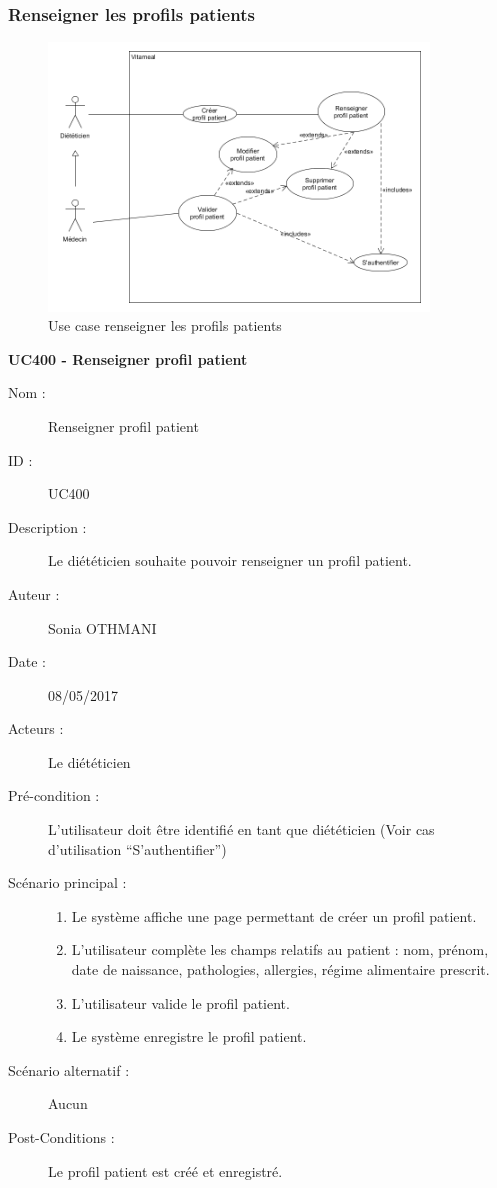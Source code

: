 \subsubsection{Renseigner les profils patients}

\begin{figure}[!h]
  \label{diagramme-renseigner-les-profils-patients}
  \centering
  \includegraphics[width=0.9\textwidth]{../../CasDUtilisations/ProfilPatient/ProfilPatient.png}
  \caption{Use case renseigner les profils patients}
\end{figure}

\textbf{UC400 - Renseigner profil patient}
\begin{description}
\item [Nom :] Renseigner profil patient
\item [ID :] UC400
\item [Description :] Le diététicien souhaite pouvoir renseigner un profil patient.
\item [Auteur :] Sonia OTHMANI
\item [Date :] 08/05/2017
\item [Acteurs :] Le diététicien
\item [Pré-condition :] L’utilisateur doit être identifié en tant que diététicien (Voir cas d’utilisation \enquote{S’authentifier})
\item [Scénario principal :]
  \begin{enumerate}
  \item Le système affiche une page permettant de créer un profil patient.
  \item L’utilisateur complète les champs relatifs au patient : nom, prénom, date de naissance, pathologies, allergies, régime alimentaire prescrit.
  \item L’utilisateur valide le profil patient.
  \item Le système enregistre le profil patient.
  \end{enumerate}
\item [Scénario alternatif :] Aucun
\item [Post-Conditions :] Le profil patient est créé et enregistré.
\end{description}

